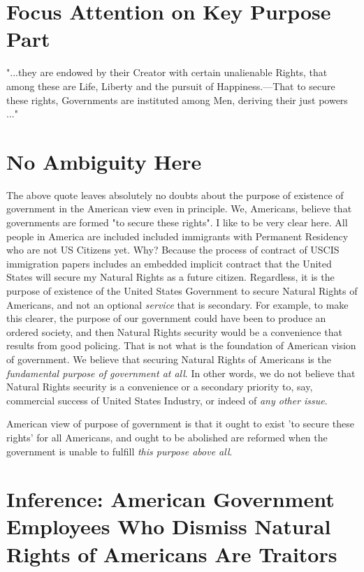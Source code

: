 \documentclass{amsart}
\begin{document}
\section{Focus Attention on Key Purpose Part}

"...they are endowed by their Creator with certain unalienable Rights, that among these are Life, Liberty and the pursuit of Happiness.—That to secure these rights, Governments are instituted among Men, deriving their just powers ..."

\section{No Ambiguity Here}

The above quote leaves absolutely no doubts about the purpose of existence of government in the American view even in principle.  We, Americans, believe that governments are formed "to secure these rights".  I like to be very clear here.  All people in America are included included immigrants with Permanent Residency who are not US Citizens yet.  Why?  Because the process of contract of USCIS immigration papers includes an embedded implicit contract that the United States will secure my Natural Rights as a future citizen. Regardless, it is the purpose of existence of the United States Government to secure Natural Rights of Americans, and not an optional {\em service} that is secondary.  For example, to make this clearer, the purpose of our government could have been to produce an ordered society, and then Natural Rights security would be a convenience that results from good policing.  That is not what is the foundation of American vision of government.  We believe that securing Natural Rights of Americans is the {\em fundamental purpose of government at all}.  In other words, we do not believe that Natural Rights security is a convenience or a secondary priority to, say, commercial success of United States Industry, or indeed of {\em any other issue}.  

American view of purpose of government is that it ought to exist 'to secure these rights' for all Americans, and ought to be abolished are reformed when the government is unable to fulfill {\em this purpose above all}.

\section{Inference: American Government Employees Who Dismiss Natural Rights of Americans Are Traitors}
\end{document}
